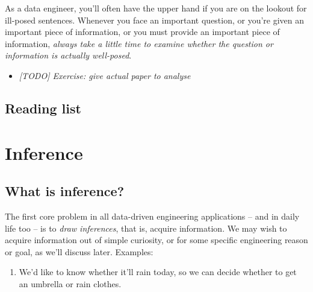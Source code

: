 \documentclass[
  letterpaper,
  DIV=11,
  numbers=noendperiod,
  oneside]{scrreprt}
\providecommand{\tightlist}{%
  \setlength{\itemsep}{0pt}\setlength{\parskip}{0pt}}\usepackage{longtable,booktabs,array}
\begin{document}
As a data engineer, you'll often have the upper hand if you are on the
lookout for ill-posed sentences. Whenever you face an important
question, or you're given an important piece of information, or you must
provide an important piece of information, \emph{always take a little
time to examine whether the question or information is actually
well-posed}.

\begin{itemize}
\tightlist
\item
  \emph{{[}TODO{]} Exercise: give actual paper to analyse}
\end{itemize}

\hypertarget{reading-list}{%
\section*{Reading list}\label{reading-list}}



\hypertarget{inference}{%
\chapter{Inference}\label{inference}}

\hypertarget{what-is-inference}{%
\section{What is inference?}\label{what-is-inference}}

The first core problem in all data-driven engineering applications --
and in daily life too -- is to \emph{draw inferences}, that is, acquire
information. We may wish to acquire information out of simple curiosity,
or for some specific engineering reason or goal, as we'll discuss later.
Examples:

\begin{enumerate}
\def\labelenumi{\arabic{enumi}.}
\tightlist
\item
  We'd like to know whether it'll rain today, so we can decide whether
  to get an umbrella or rain clothes.
\end{enumerate}
\end{document}
